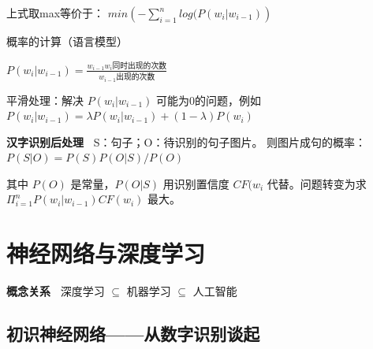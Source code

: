 \documentclass[b4paper, 10pt]{ctexart}
\makeatletter
\newenvironment{figurehere}
{\def\@captype{figure}}
{}
\makeatother
\begin{document}
\begin{multicols}{3}
上式取max等价于：
$
min\left(-\sum_{i=1}^n log(P(w_i|w_{i-1})\right)
$

概率的计算（语言模型）

\quad
$
P(w_i|w_{i-1})=\frac{w_{i-1}w_{i}\mbox{同时出现的次数}}{w_{i-1}\mbox{出现的次数}}
$

平滑处理：解决 $P(w_i|w_{i-1})$ 可能为0的问题，例如
$
P(w_i|w_{i-1}) = \lambda P(w_i|w_{i-1}) + (1-\lambda) P(w_i)
$

\textbf{汉字识别后处理\ } 
S：句子；O：待识别的句子图片。
则图片成句的概率：
$
P(S|O) = P(S)P(O|S)/P(O)
$

其中 $P(O)$ 是常量，$P(O|S)$ 用识别置信度 $CF(w_i$ 代替。问题转变为求
$\Pi_{i=1}^n P(w_i|w_{i-1})CF(w_i)$
最大。

\section{神经网络与深度学习}
\textbf{概念关系\ } 深度学习 $\subseteq$ 机器学习 $\subseteq$ 人工智能 


\subsection{初识神经网络——从数字识别谈起}












\end{multicols}
\end{document}
